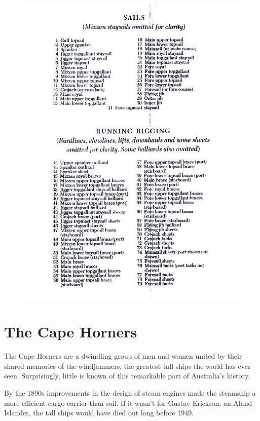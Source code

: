 \documentclass[
  11pt,
  msmallroyalvopaper
]{memoir}
\begin{document}
\begin{figure}
\centering
\includegraphics{./images/rigging2.jpg}
\end{figure}

\hypertarget{the-cape-horners}{%
\chapter{The Cape Horners}\label{the-cape-horners}}

The Cape Horners are a dwindling group of men and women united by their shared memories
of the windjammers, the greatest tall ships the world has ever seen. Surprisingly, little
is known of this remarkable part of Australia’s history.

By the 1890s improvements in the design of steam engines made the steamship a more
efficient cargo carrier than sail. If it wasn’t for Gustav Erickson, an Aland Islander,
the tall ships would have died out long before 1949.
\end{document}
